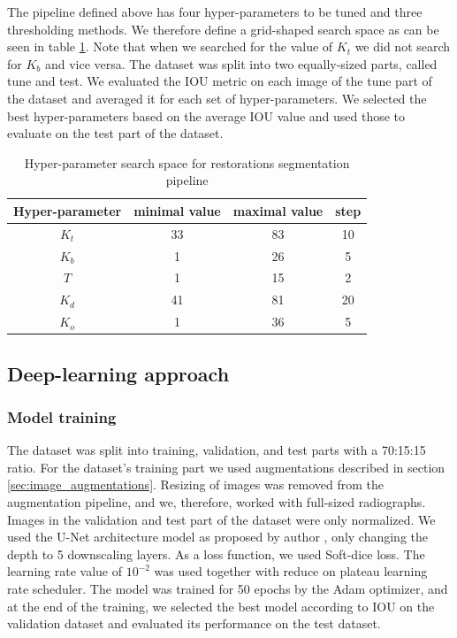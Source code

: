 The pipeline defined above has four hyper-parameters to be tuned and three thresholding methods. We therefore define a grid-shaped search space as can be seen in table \ref{tab:hyper_param_segmentation}. Note that when we searched for the value of $K_t$ we did not search for $K_b$ and vice versa.
The dataset was split into two equally-sized parts, called tune and test. We evaluated the IOU metric on each image of the tune part of the dataset and averaged it for each set of hyper-parameters. We selected the best hyper-parameters based on the average IOU value and used those to evaluate on the test part of the dataset.

\begin{table}
    \begin{tabular}{|c|c|c|c|}
        \hline
        Hyper-parameter & minimal value & maximal value & step \\ \hline
        $K_t$           & 33            & 83            & 10   \\ \hline
        $K_b$           & 1             & 26            & 5    \\ \hline
        $T$             & 1             & 15            & 2    \\ \hline
        $K_d$           & 41            & 81            & 20   \\ \hline
        $K_o$           & 1             & 36            & 5    \\ \hline
    \end{tabular}
    \caption{Hyper-parameter search space for restorations segmentation pipeline}
    \label{tab:hyper_param_segmentation}
\end{table}

\subsection{Deep-learning approach}
\subsubsection{Model training}
The dataset was split into training, validation, and test parts with a 70:15:15 ratio. For the dataset's training part we used augmentations described in section \ref{sec:image_augmentations}. Resizing of images was removed from the augmentation pipeline, and we, therefore, worked with full-sized radiographs. Images in the validation and test part of the dataset were only normalized.
We used the U-Net architecture model as proposed by author \cite{Ronneberger2015}, only changing the depth to 5 downscaling layers. As a loss function, we used Soft-dice loss. The learning rate value of $10^{-2}$ was used together with reduce on plateau learning rate scheduler. The model was trained for 50 epochs by the Adam optimizer, and at the end of the training, we selected the best model according to IOU on the validation dataset and evaluated its performance on the test dataset.

